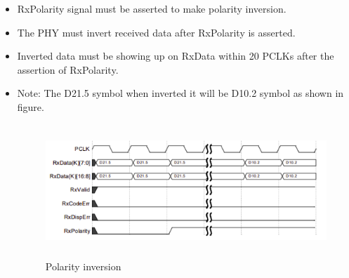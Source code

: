 \begin{itemize}
    \item RxPolarity signal must be asserted to make polarity inversion.

    \item The PHY must invert received data after RxPolarity is asserted.

    \item Inverted data must be showing up on RxData within 20 PCLKs after the assertion of RxPolarity.

    \item Note: The D21.5 symbol when inverted it will be D10.2 symbol as shown in figure.
\begin{figure}[H]
  \centering
  \includegraphics[width=140mm,height=50mm]{images/clk_diagram/p.png}
  \caption{Polarity inversion}
  \label{lane}
\end{figure}
\end{itemize}
